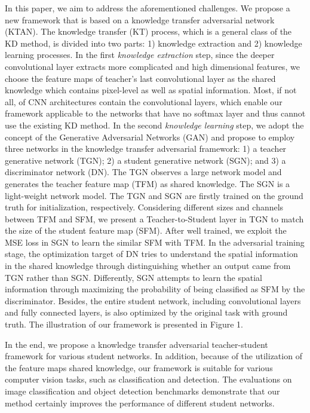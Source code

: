 \documentclass[letterpaper]{article} %
\begin{document}
In this paper, we aim to address the aforementioned challenges. We propose a new framework that is based on a knowledge transfer adversarial network (KTAN).
The knowledge transfer (KT) process, which is a general class of the KD method, is divided into two parts: 1) knowledge extraction and 2) knowledge learning processes.
In the first \textit{knowledge extraction} step, since the deeper convolutional layer extracts more complicated and high dimensional features, we choose the feature maps of teacher's last convolutional layer as the shared knowledge which contains pixel-level as well as spatial information.
Most, if not all, of CNN architectures contain the convolutional layers, which enable our framework applicable to the networks that have no softmax layer and thus cannot use the existing KD method. In the second \textit{knowledge learning} step, we adopt the concept of the Generative Adversarial Networks (GAN) and propose to employ three networks in the knowledge transfer adversarial framework: 1) a teacher generative network (TGN); 2) a student generative network (SGN); and 3) a discriminator network (DN). The TGN observes a large network model and generates the teacher feature map (TFM) as shared knowledge. The SGN is a light-weight network model. The TGN and SGN are firstly trained on the ground truth for initialization, respectively. Considering different sizes and channels between TFM and SFM, we present a Teacher-to-Student layer in TGN to match the size of the student feature map (SFM).
After well trained, we exploit the MSE loss in SGN to learn the similar SFM with TFM. In the adversarial training stage, the optimization target of DN tries to understand the spatial information in the shared knowledge through distinguishing whether an output came from TGN rather than SGN. Differently, SGN attempts to learn the spatial information through maximizing the probability of being classified as SFM by the discriminator. Besides, the entire student network, including convolutional layers and fully connected layers, is also optimized by the original task with ground truth. The illustration of our framework is presented in Figure 1.

In the end, we propose a knowledge transfer adversarial teacher-student framework for various student networks. In addition, because of the utilization of the feature maps shared knowledge, our framework is suitable for various computer vision tasks, such as classification and detection. The evaluations on image classification and object detection benchmarks demonstrate that our method certainly improves the performance of different student networks.
\end{document}
